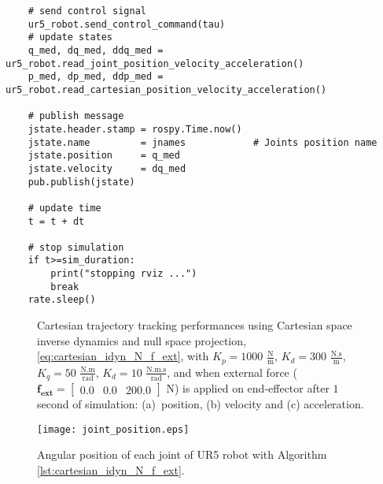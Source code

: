 \begin{lstlisting}
    # send control signal
    ur5_robot.send_control_command(tau)
    # update states
    q_med, dq_med, ddq_med = ur5_robot.read_joint_position_velocity_acceleration()
    p_med, dp_med, ddp_med = ur5_robot.read_cartesian_position_velocity_acceleration()

    # publish message
    jstate.header.stamp = rospy.Time.now()
    jstate.name 		= jnames			# Joints position name
    jstate.position 	= q_med
    jstate.velocity 	= dq_med
    pub.publish(jstate)

    # update time
    t = t + dt  
    
    # stop simulation
    if t>=sim_duration:
        print("stopping rviz ...")
        break
    rate.sleep()
\end{lstlisting}

\begin{figure}%
	\centering
	\caption{Cartesian trajectory tracking performances using Cartesian space inverse dynamics and null space projection, \eqref{eq:cartesian_idyn_N_f_ext}, with  ${K_{p}}=1000$ $\mathrm{\frac{N}{m}}$, $K_{d}= 300$ $\mathrm{\frac{N.s}{m}}$, ${K_{q}}=50$ $\mathrm{\frac{N.m}{rad}}$, $K_{d}= 10$ $\mathrm{\frac{N.m.s}{rad}}$, and when external force ($\mathbf{f_{ext}}=\begin{bmatrix} 0.0 & 0.0 & 200.0\end{bmatrix}$ N) is applied on end-effector after $1$ second of simulation: (a)~position, (b) velocity and (c) acceleration.}
	\label{fig:act_2.3_ee_position}
\end{figure}

\begin{figure}
    \centering
    \texttt{[image: joint\_position.eps]}	
    \caption{Angular position of each joint of UR5 robot with Algorithm \ref{lst:cartesian_idyn_N_f_ext}.}
    \label{fig:act_2.3_joint_position}
\end{figure}